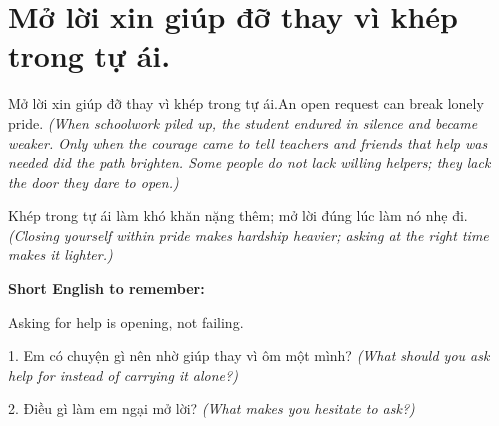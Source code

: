 \section{Mở lời xin giúp đỡ thay vì khép trong tự ái.}
\begin{truyen}{Mở lời xin giúp đỡ thay vì khép trong tự ái.}{An open request can break lonely pride.}
\textit{(When schoolwork piled up, the student endured in silence and became weaker. Only when the courage came to tell teachers and friends that help was needed did the path brighten. Some people do not lack willing helpers; they lack the door they dare to open.)}
\end{truyen}
\begin{baihoc}
Khép trong tự ái làm khó khăn nặng thêm; mở lời đúng lúc làm nó nhẹ đi.
\textit{(Closing yourself within pride makes hardship heavier; asking at the right time makes it lighter.)}
\end{baihoc}
\begin{ghinhoanh}
\textbf{Short English to remember:}

Asking for help is opening, not failing.
\end{ghinhoanh}
\begin{tuhocnhanh}
1. Em có chuyện gì nên nhờ giúp thay vì ôm một mình? \textit{(What should you ask help for instead of carrying it alone?)}

2. Điều gì làm em ngại mở lời? \textit{(What makes you hesitate to ask?)}
\end{tuhocnhanh}
\ngancach


